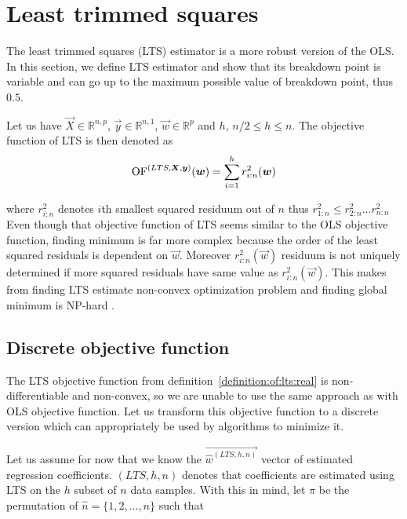 \section{Least trimmed squares}
The least trimmed squares (LTS) estimator is a more robust version of the OLS. In this section, we define LTS estimator and show that its breakdown point is variable and can go up to the maximum possible value of breakdown point, thus~$0.5$.

\begin{definition} \label{definition:of:lts:real}
Let us have $\vec{X} \in \mathbb{R}^{n,p}$, $\vec{y} \in \mathbb{R}^{n,1}$, 
    $\vec{w} \in \mathbb{R}^p$ and $h$, $ n/2 \leq h \leq n$. The objective function of LTS is then denoted as 
    \begin{equation}  
        \operatorname{OF}^{(LTS,\boldsymbol{X}, \boldsymbol{y})}(\boldsymbol{w}) =  \sum\limits_{i=1}^h r_{i:n}^2(\boldsymbol{w})  
    \end{equation}
\end{definition}
where $r_{i:n}^2$ denotes $i$th smallest squared residuum out of $n$ thus $r_{1:n}^2 \leq r_{2:n}^2 \ldots r_{n:n}^2$
Even though that objective function of LTS seems similar to the OLS objective function, finding minimum is far more complex because the order of the least squared residuals is dependent on $\vec{w}$. Moreover  $r_{i:n}^2(\vec{w})$ residuum is not uniquely determined if more squared residuals have same value as $r_{i:n}^2(\vec{w})$. This makes from finding LTS estimate non-convex optimization problem and finding global minimum is NP-hard \cite{bernholt2006robust}. 

\subsection{Discrete objective function}
The LTS objective function from definition~\ref{definition:of:lts:real} is non-differentiable and non-convex, so we are unable to use the same approach as with OLS objective function. Let us transform this objective function to a discrete version which can appropriately be used by algorithms to minimize it.

Let us assume for now that we know the $\vec{\hat{w}^{(LTS, h, n)}}$ vector of estimated regression coefficients. $(LTS, h, n)$ denotes that coefficients are estimated using LTS on the $h$ subset of $n$ data samples. 
With this in mind, let $\pi$ be the permutation of $\hat{n} = \{{1,2,\ldots, n\}}$ such that 

